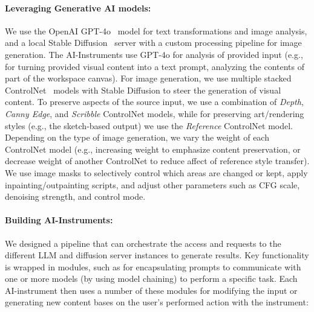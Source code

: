 \paragraph{Leveraging Generative AI models:}
We use the OpenAI GPT-4o~\cite{openai_gpt-4o_2024} model for text transformations and image analysis, and a local Stable Diffusion~\cite{stabilityai_compvisstable-diffusion_nodate} server with a custom processing pipeline for image generation. The AI-Instruments use GPT-4o for analysis of provided input (e.g., for turning provided visual content into a text prompt, analyzing the contents of part of the workspace canvas). For image generation, we use multiple stacked ControlNet~\cite{zhang_controlnet_2023} models with Stable Diffusion to steer the generation of visual content. To preserve aspects of the source input, we use a combination of \textit{Depth}, \textit{Canny Edge}, and \textit{Scribble} ControlNet models, while for preserving art/rendering styles (e.g., the sketch-based output) we use the \textit{Reference} ControlNet model. Depending on the type of image generation, we vary the weight of each ControlNet model (e.g., increasing weight to emphasize content preservation, or decrease weight of another ControlNet to reduce affect of reference style transfer). We use image masks to selectively control which areas are changed or kept, apply inpainting/outpainting scripts, and adjust other parameters such as CFG scale, denoising strength, and control mode. 

\paragraph{Building AI-Instruments:}
We designed a pipeline that can orchestrate the access and requests to the different LLM and diffusion server instances to generate results. Key functionality is wrapped in modules, such as for encapsulating prompts to communicate with one or more models (by using model chaining) to perform a specific task. 
Each AI-instrument then uses a number of these modules for modifying the input or generating new content bases on the user's performed action with the instrument:


